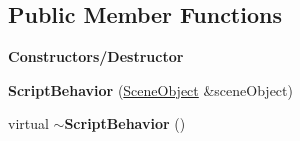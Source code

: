 \subsection*{Public Member Functions}
\begin{Indent}\textbf{ Constructors/\+Destructor}\par
\begin{DoxyCompactItemize}
\item 
\mbox{\label{classrev_1_1_script_behavior_ad96d293305ea21964fea2ba3b46298d0}} 
{\bfseries Script\+Behavior} (\mbox{\hyperlink{classrev_1_1_scene_object}{Scene\+Object}} \&scene\+Object)
\item 
\mbox{\label{classrev_1_1_script_behavior_a55bda80ab5388c825b263bcd6ca3d75b}} 
virtual {\bfseries $\sim$\+Script\+Behavior} ()
\end{DoxyCompactItemize}
\end{Indent}
